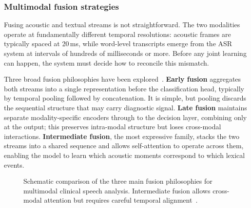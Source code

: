 \subsubsection{Multimodal fusion strategies}
\label{ssec:fusion}

Fusing acoustic and textual streams is not straightforward.
The two modalities operate at fundamentally different temporal resolutions: acoustic frames are typically spaced at 20\,ms, while word-level transcripts emerge from the ASR system at intervals of hundreds of milliseconds or more.
Before any joint learning can happen, the system must decide how to reconcile this mismatch.

Three broad fusion philosophies have been explored~\cite{ding2024speechsurvey,esteve2025speechadppa}.
\textbf{Early fusion} aggregates both streams into a single representation before the classification head, typically by temporal pooling followed by concatenation.
It is simple, but pooling discards the sequential structure that may carry diagnostic signal.
\textbf{Late fusion} maintains separate modality-specific encoders through to the decision layer, combining only at the output; this preserves intra-modal structure but loses cross-modal interactions.
\textbf{Intermediate fusion}, the most expressive family, stacks the two streams into a shared sequence and allows self-attention to operate across them, enabling the model to learn which acoustic moments correspond to which lexical events.

\begin{figure}[H]
    \centering
    \caption[Fusion strategies]{Schematic comparison of the three main fusion philosophies for multimodal clinical speech analysis. Intermediate fusion allows cross-modal attention but requires careful temporal alignment~\cite{ding2024speechsurvey}.}
    \label{fig:fusion_strategies}
\end{figure}

